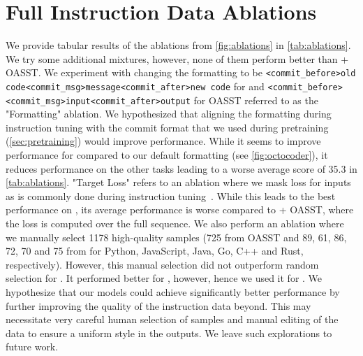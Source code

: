 \FloatBarrier

\section{Full Instruction Data Ablations}
\label{sec:ablations}

We provide tabular results of the ablations from \autoref{fig:ablations} in \autoref{tab:ablations}. We try some additional mixtures, however, none of them perform better than \dataft{} + OASST. We experiment with changing the formatting to be \verb|<commit_before>old code<commit_msg>message<commit_after>new code| for \dataft{} and \verb|<commit_before><commit_msg>input<commit_after>output| for OASST referred to as the "Formatting" ablation. We hypothesized that aligning the formatting during instruction tuning with the commit format that we used during pretraining (\autoref{sec:pretraining}) would improve performance. While it seems to improve performance for \evalf{} compared to our default formatting (see \autoref{fig:octocoder}), it reduces performance on the other tasks leading to a worse average score of 35.3 in \autoref{tab:ablations}. "Target Loss" refers to an ablation where we mask loss for inputs as is commonly done during instruction tuning~\citep{muennighoff2022crosslingual}. While this leads to the best performance on \evals{}, its average performance is worse compared to \dataft{} + OASST, where the loss is computed over the full sequence. We also perform an ablation where we manually select 1178 high-quality samples (725 from OASST and 89, 61, 86, 72, 70 and 75 from \dataft{} for Python, JavaScript, Java, Go, C++ and Rust, respectively). However, this manual selection did not outperform random selection for \model{}. It performed better for \modelx{}, however, hence we used it for \modelx{}. We hypothesize that our models could achieve significantly better performance by further improving the quality of the instruction data beyond. This may necessitate very careful human selection of samples and manual editing of the data to ensure a uniform style in the outputs. We leave such explorations to future work.

